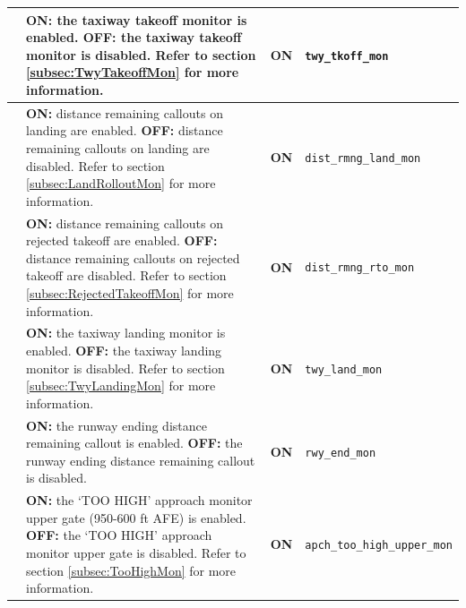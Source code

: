\documentclass[a4paper,12pt]{article}
\newcommand{\confopt}[1]{\texttt{#1}}
\begin{document}
{\begin{center}
\begin{supertabular}{|c|p{8cm}|c|l|}
\hline

 &
\textbf{ON:} the taxiway takeoff monitor is enabled.\newline
\textbf{OFF:} the taxiway takeoff monitor is disabled.\newline
Refer to section \ref{subsec:TwyTakeoffMon} for more information. &
\textbf{ON} & \confopt{twy\_tkoff\_mon} \\

\hline

 &
\textbf{ON:} distance remaining callouts on landing are enabled.\newline
\textbf{OFF:} distance remaining callouts on landing are disabled.\newline
Refer to section \ref{subsec:LandRolloutMon} for more information. &
\textbf{ON} & \confopt{dist\_rmng\_land\_mon} \\

\hline

 &
\textbf{ON:} distance remaining callouts on rejected takeoff are
enabled.\newline
\textbf{OFF:} distance remaining callouts on rejected takeoff are
disabled.\newline
Refer to section \ref{subsec:RejectedTakeoffMon} for more information. &
\textbf{ON} & \confopt{dist\_rmng\_rto\_mon} \\

\hline

 &
\textbf{ON:} the taxiway landing monitor is enabled.\newline
\textbf{OFF:} the taxiway landing monitor is disabled.\newline
Refer to section \ref{subsec:TwyLandingMon} for more information. &
\textbf{ON} & \confopt{twy\_land\_mon} \\

\hline

 &
\textbf{ON:} the runway ending distance remaining callout is enabled.\newline
\textbf{OFF:} the runway ending distance remaining callout is disabled. &
\textbf{ON} & \confopt{rwy\_end\_mon} \\

\hline

 &
\textbf{ON:} the `TOO HIGH' approach monitor upper gate (950-600 ft AFE)
is enabled.\newline
\textbf{OFF:} the `TOO HIGH' approach monitor upper gate is disabled.\newline
Refer to section \ref{subsec:TooHighMon} for more information. &
\textbf{ON} & \confopt{apch\_too\_high\_upper\_mon} \\


\end{supertabular}
\end{center}}
\end{document}
